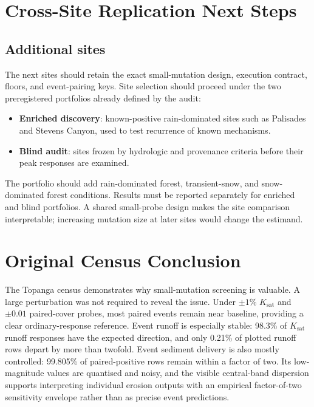 \documentclass[11pt]{article}
\newcommand{\Ksat}{\ensuremath{K_{\mathrm{sat}}}}
\begin{document}
\section{Cross-Site Replication Next Steps}

\subsection{Additional sites}

The next sites should retain the exact small-mutation design, execution
contract, floors, and event-pairing keys. Site selection should proceed under
the two preregistered portfolios already defined by the audit:

\begin{itemize}
  \item \textbf{Enriched discovery}: known-positive rain-dominated sites such
    as Palisades and Stevens Canyon, used to test recurrence of known mechanisms.
  \item \textbf{Blind audit}: sites frozen by hydrologic and provenance criteria
    before their peak responses are examined.
\end{itemize}

The portfolio should add rain-dominated forest, transient-snow, and
snow-dominated forest conditions. Results must be reported separately for
enriched and blind portfolios. A shared small-probe design makes the site
comparison interpretable; increasing mutation size at later sites would change
the estimand.

\section{Original Census Conclusion}

The Topanga census demonstrates why small-mutation screening is valuable. A
large perturbation was not required to reveal the issue. Under $\pm1\%$ \Ksat{}
and $\pm0.01$ paired-cover probes, most paired events remain near baseline,
providing a clear ordinary-response reference. Event runoff is especially
stable: 98.3\% of \Ksat{} runoff responses have the expected direction, and
only 0.21\% of plotted runoff rows depart by more than twofold. Event sediment
delivery is also mostly controlled: 99.805\% of paired-positive rows remain
within a factor of two. Its low-magnitude values are quantised and noisy, and
the visible central-band dispersion supports interpreting individual erosion
outputs with an empirical factor-of-two sensitivity envelope rather than as
precise event predictions.
\end{document}
